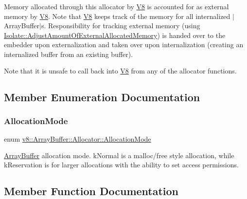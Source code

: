 Memory allocated through this allocator by \mbox{\hyperlink{classv8_1_1V8}{V8}} is accounted for as external memory by \mbox{\hyperlink{classv8_1_1V8}{V8}}. Note that \mbox{\hyperlink{classv8_1_1V8}{V8}} keeps track of the memory for all internalized $\vert$\+Array\+Buffer$\vert$s. Responsibility for tracking external memory (using \mbox{\hyperlink{classv8_1_1Isolate_aaeda5fa60961a3d9d476c46200e30711}{Isolate\+::\+Adjust\+Amount\+Of\+External\+Allocated\+Memory}}) is handed over to the embedder upon externalization and taken over upon internalization (creating an internalized buffer from an existing buffer).

Note that it is unsafe to call back into \mbox{\hyperlink{classv8_1_1V8}{V8}} from any of the allocator functions. 

\subsection{Member Enumeration Documentation}
\mbox{\label{classv8_1_1ArrayBuffer_1_1Allocator_ab106d1fbad7be9f6fd8b0f5c550ac59e}} 
\subsubsection{\texorpdfstring{Allocation\+Mode}{AllocationMode}}
{\footnotesize\ttfamily enum \mbox{\hyperlink{classv8_1_1ArrayBuffer_1_1Allocator_ab106d1fbad7be9f6fd8b0f5c550ac59e}{v8\+::\+Array\+Buffer\+::\+Allocator\+::\+Allocation\+Mode}}\hspace{0.3cm}{\ttfamily [strong]}}

\mbox{\hyperlink{classv8_1_1ArrayBuffer}{Array\+Buffer}} allocation mode. k\+Normal is a malloc/free style allocation, while k\+Reservation is for larger allocations with the ability to set access permissions. 

\subsection{Member Function Documentation}
\mbox{\label{classv8_1_1ArrayBuffer_1_1Allocator_a106b0d80120ed04fe9b9675e96f0340b}} 
